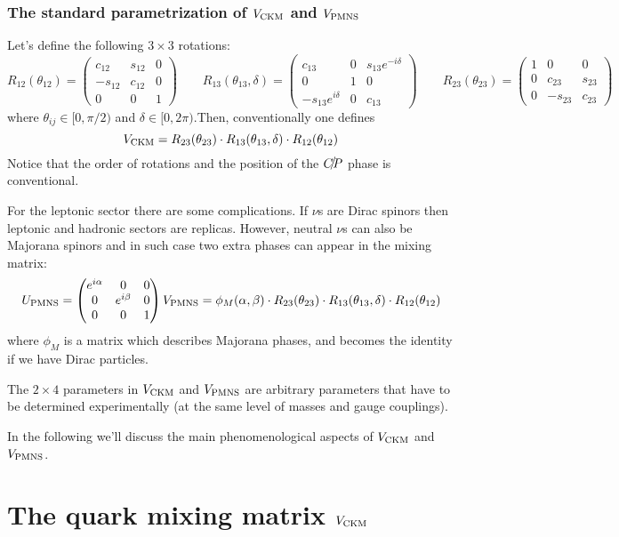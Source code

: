 \documentclass[TheoreticalPhy_ModB.tex]{subfiles}
\begin{document}
\subsubsection{The standard parametrization of $V_{\text{CKM}}$ and $V_{\text{PMNS}}$}
Let's define the following $3\times3$ rotations:
\[R_{12}(\theta_{12})=\begin{pmatrix}c_{12}&s_{12}&0\\-s_{12}&c_{12}&0\\0&0&1\end{pmatrix}\qquad
R_{13}(\theta_{13},\delta)=\begin{pmatrix}c_{13}&0&s_{13}e^{-i\delta}\\0&1&0\\-s_{13}e^{i\delta}&0&c_{13}\end{pmatrix}\qquad
R_{23}(\theta_{23})=\begin{pmatrix}1&0&0\\0&c_{23}&s_{23}\\0&-s_{23}&c_{23}\end{pmatrix}\]
where $\theta_{ij}\in[0,\pi/2)$ and $\delta\in[0,2\pi)$.Then, conventionally one defines 
\[V_{\text{CKM}}=R_{23}(\theta_{23})\cdot R_{13}(\theta_{13},\delta)\cdot R_{12}(\theta_{12})\]
Notice that the order of rotations and the position of the $\slashed{CP}$ phase is conventional. 

For the leptonic sector there are some complications. If $\nu$s are Dirac spinors then leptonic and hadronic sectors are replicas. However, neutral $\nu$s can also be Majorana spinors and in such case two extra phases can appear in the mixing matrix:
\[U_{\text{PMNS}}=\begin{pmatrix}e^{i\alpha}&0&0\\0&e^{i\beta}&0\\0&0&1\end{pmatrix}V_{\text{PMNS}} = \phi_M(\alpha,\beta)\cdot R_{23}(\theta_{23})\cdot R_{13}(\theta_{13},\delta)\cdot R_{12}(\theta_{12})\]
where $\phi_M$ is a matrix which describes Majorana phases, and becomes the identity if we have Dirac particles. 

The $2\times4$ parameters in $V_{\text{CKM}}$ and $V_{\text{PMNS}}$ are arbitrary parameters that have to be determined experimentally (at the same level of masses and gauge couplings). 

In the following we'll discuss the main phenomenological aspects of $V_{\text{CKM}}$ and $V_{\text{PMNS}}$. 

\section{The quark mixing matrix $V_{\text{CKM}}$}
\end{document}
